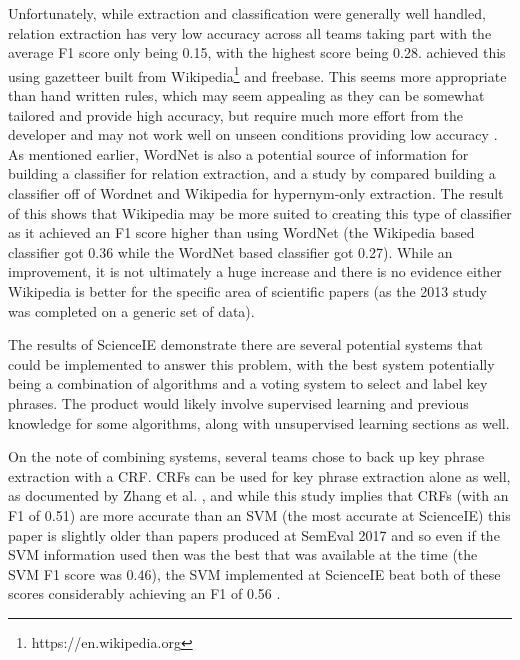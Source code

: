 Unfortunately, while extraction and classification were generally well handled, relation extraction has very low accuracy across all teams taking part with the average F1 score only being 0.15, with the highest score being 0.28. \cite{Ammar2017} achieved this using gazetteer built from Wikipedia\footnote{https://en.wikipedia.org} and freebase. This seems more appropriate than hand written rules, which may seem appealing as they can be somewhat tailored and provide high accuracy, but require much more effort from the developer and may not work well on unseen conditions providing low accuracy \cite{Manning2012}. As mentioned earlier, WordNet is also a potential source of information for building a classifier for relation extraction, and a study by \cite{Snow2013} compared building a classifier off of Wordnet and Wikipedia for hypernym-only extraction. The result of this shows that Wikipedia may be more suited to creating this type of classifier as it achieved an F1 score higher than using WordNet (the Wikipedia based classifier got 0.36 while the WordNet based classifier got 0.27). While an improvement, it is not ultimately a huge increase and there is no evidence either Wikipedia is better for the specific area of scientific papers (as the 2013 study was completed on a generic set of data).

The results of ScienceIE demonstrate there are several potential systems that could be implemented to answer this problem, with the best system potentially being a combination of algorithms and a voting system to select and label key phrases. The product would likely involve supervised learning and previous knowledge for some algorithms, along with unsupervised learning sections as well.

On the note of combining systems, several teams chose to back up key phrase extraction with a CRF. CRFs can be used for key phrase extraction alone as well, as documented by Zhang et al. \cite{Zhang2008}, and while this study implies that CRFs (with an F1 of 0.51) are more accurate than an SVM (the most accurate at ScienceIE) this paper is slightly older than papers produced at SemEval 2017 and so even if the SVM information used then was the best that was available at the time (the SVM F1 score was 0.46), the SVM implemented at ScienceIE beat both of these scores considerably achieving an F1 of 0.56 \cite{Augenstein2017}.

